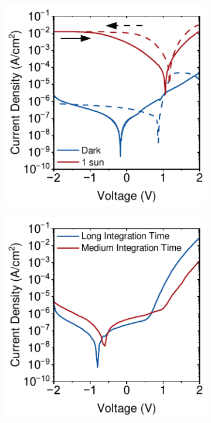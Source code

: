 \begin{figure}[ht!]
    \centering

    \begin{subfigure}[b]{0.35\textwidth}
        \centering
        \includegraphics[width=\textwidth]{chapters/material_properties/images/Forward-Reverse-Plot.pdf}
        \caption{}
        \label{fig:ch2:scan_direction}
    \end{subfigure}
    \hspace{1cm} %
    \begin{subfigure}[b]{0.35\textwidth}
        \centering
        \includegraphics[width=\textwidth]{chapters/material_properties/images/Integration-Speed.pdf}
        \caption{}
        \label{fig:ch2:scan_speed}
    \end{subfigure}


\end{figure}

